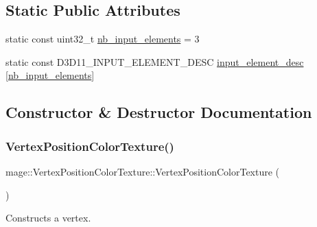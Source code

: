 \subsection*{Static Public Attributes}
\begin{DoxyCompactItemize}
\item 
static const uint32\+\_\+t \hyperlink{structmage_1_1_vertex_position_color_texture_a435a9387a5dda4fb5aff9b9b3f11e736}{nb\+\_\+input\+\_\+elements} = 3
\item 
static const D3\+D11\+\_\+\+I\+N\+P\+U\+T\+\_\+\+E\+L\+E\+M\+E\+N\+T\+\_\+\+D\+E\+SC \hyperlink{structmage_1_1_vertex_position_color_texture_a4be64221f4ae8e2bf37bb83fb59f2f0c}{input\+\_\+element\+\_\+desc} \mbox{[}\hyperlink{structmage_1_1_vertex_position_color_texture_a435a9387a5dda4fb5aff9b9b3f11e736}{nb\+\_\+input\+\_\+elements}\mbox{]}
\end{DoxyCompactItemize}


\subsection{Constructor \& Destructor Documentation}
\hypertarget{structmage_1_1_vertex_position_color_texture_a49020fb0c115c3dc3c94471fcbc30a82}{}\label{structmage_1_1_vertex_position_color_texture_a49020fb0c115c3dc3c94471fcbc30a82} 
\subsubsection{\texorpdfstring{Vertex\+Position\+Color\+Texture()}{VertexPositionColorTexture()}\hspace{0.1cm}{\footnotesize\ttfamily [1/3]}}
{\footnotesize\ttfamily mage\+::\+Vertex\+Position\+Color\+Texture\+::\+Vertex\+Position\+Color\+Texture (\begin{DoxyParamCaption}{ }\end{DoxyParamCaption})\hspace{0.3cm}{\ttfamily [default]}}

Constructs a vertex. \hypertarget{structmage_1_1_vertex_position_color_texture_a98753386ae479cdc11174136bf8e9412}{}\label{structmage_1_1_vertex_position_color_texture_a98753386ae479cdc11174136bf8e9412} 

